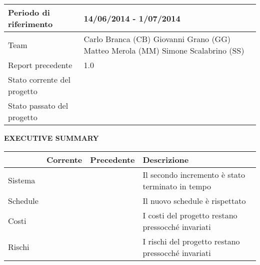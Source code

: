 
\begin{table}[ht]
\centering
\begin{tabular}{|g|p{8cm}|}
 \hline
  Periodo di riferimento		& 14/06/2014 - 1/07/2014\\
  \hline
  Team 					& Carlo Branca (CB)\newline
  					Giovanni Grano (GG)\newline
  					Matteo Merola (MM)\newline
  					Simone Scalabrino (SS)\\
  \hline
  Report precedente			& 1.0\\
  \hline
  Stato corrente del progetto		& \\
  \hline
  Stato passato del progetto		& \\
  \hline
\end{tabular}
\end{table}

\begin{center} \textbf{EXECUTIVE SUMMARY} \end{center}
\begin{table}[ht]
\centering
\begin{tabular}{|h|p{2cm}|p{2cm}|p{5.5cm}|}
  \hline
  	& Corrente		& Precedente		& Descrizione\\
  \hline
  Sistema		& 	& 	& \footnotesize Il secondo incremento è stato terminato in tempo\\
  \hline
  Schedule		& 	& 	& \footnotesize Il nuovo schedule è rispettato\\
  \hline
  Costi			& 	& 	& \footnotesize I costi del progetto restano pressocché invariati\\
  \hline
  Rischi		& 	& 	& \footnotesize I rischi del progetto restano pressocché invariati\\
  \hline
\end{tabular}
\end{table}


